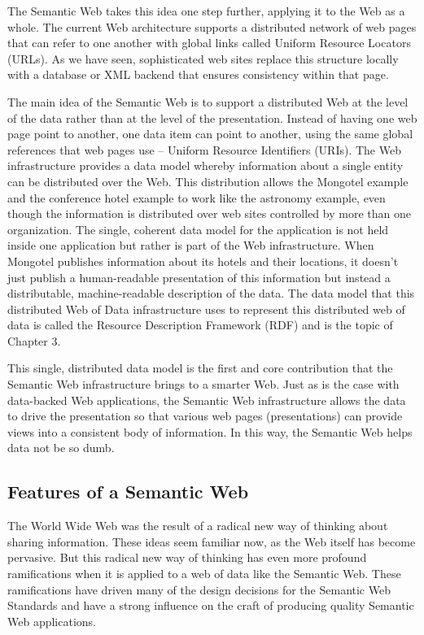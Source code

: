 The Semantic Web takes this idea one step further, applying it to the
Web as a whole. The current Web architecture supports a distributed
network of web pages that can refer to one another with global links
called Uniform Resource Locators (URLs). As we have seen, sophisticated
web sites replace this structure locally with a database or XML backend
that ensures consistency within that page.

The main idea of the Semantic Web is to support a distributed Web at the
level of the data rather than at the level of the presentation. Instead
of having one web page point to another, one data item can point to
another, using the same global references that web pages use -- Uniform
Resource Identifiers (URIs). The Web infrastructure provides a data
model whereby information about a single entity can be distributed over
the Web. This distribution allows the Mongotel example and the
conference hotel example to work like the astronomy example, even though
the information is distributed over web sites controlled by more than
one organization. The single, coherent data model for the application is
not held inside one application but rather is part of the Web
infrastructure. When Mongotel publishes information about its hotels and
their locations, it doesn't just publish a human-readable presentation
of this information but instead a distributable, machine-readable
description of the data. The data model that this distributed Web of
Data infrastructure uses to represent this distributed web of data is
called the Resource Description Framework (RDF) and is the topic of
Chapter 3.

This single, distributed data model is the first and core contribution
that the Semantic Web infrastructure brings to a smarter Web. Just as is
the case with data-backed Web applications, the Semantic Web
infrastructure allows the data to drive the presentation so that various
web pages (presentations) can provide views into a consistent body of
information. In this way, the Semantic Web helps data not be so dumb.

\subsection{Features of a Semantic Web}

The World Wide Web was the result of a radical new way of thinking about
sharing information. These ideas seem familiar now, as the Web itself
has become pervasive. But this radical new way of thinking has even more
profound ramifications when it is applied to a web of data like the
Semantic Web. These ramifications have driven many of the design
decisions for the Semantic Web Standards and have a strong influence on
the craft of producing quality Semantic Web applications.

